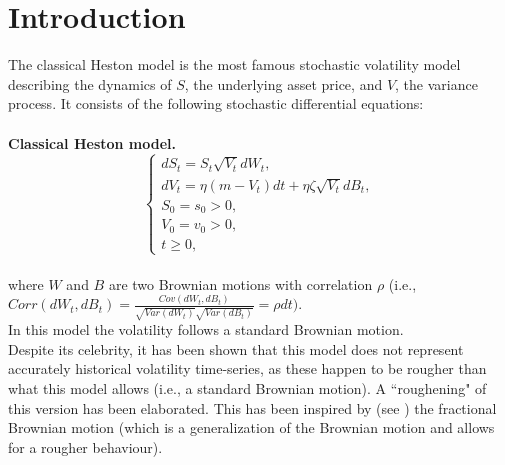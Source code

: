 \documentclass[a4paper,italian,11pt]{book}
\theoremstyle{plain}
\theoremstyle{remark}
\theoremstyle{plain}
\begin{document}
\chapter*{Introduction}

The classical Heston model is the most famous stochastic volatility model describing the dynamics of $S$, the underlying asset price, and $V$, the variance process. It consists of the following stochastic differential equations:
\\
\\
\textbf{Classical Heston model.}
\begin{equation}
    \label{eq: classicalHeston}
    \begin{cases}
    dS_t = S_t \sqrt{V_t} dW_t, \\
    dV_t = \eta (m - V_t) dt +  \eta \zeta \sqrt{V_t} dB_t, \\
    S_0 = s_0 >0, \\
    V_0 = v_0 >0, \\            
    t \ge 0,
    \end{cases}
\end{equation}
\\
where $W$ and $B$ are two Brownian motions with correlation $\rho$ (i.e., \\
$Corr(dW_t,dB_t) = \frac{Cov(dW_t, dB_t)}{\sqrt{Var(dW_t)} \sqrt{ Var(dB_t)}} = \rho dt)$. 
\\
In this model the volatility follows a standard Brownian motion.
\\

Despite its celebrity, it has been shown that this model does not represent accurately historical volatility time-series, as these happen to be rougher than what this model allows
(i.e., a standard Brownian motion). 
A ``roughening" of this version has been elaborated. This has been inspired by (see \cite{rosenbaum1}) the fractional Brownian motion (which is a generalization of the Brownian motion and allows for a rougher behaviour).
\\
\end{document}
